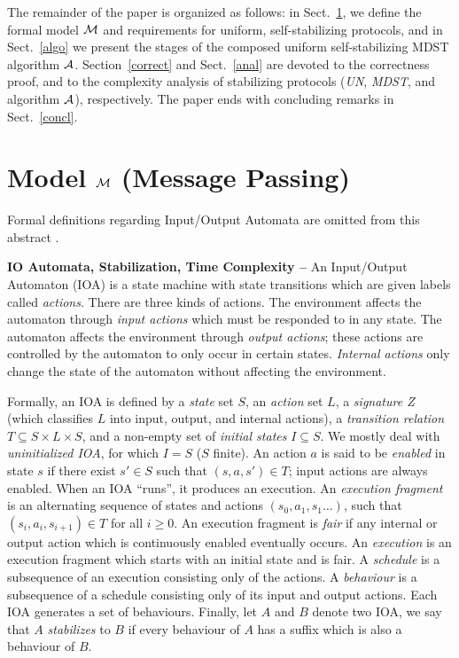 \documentclass[10pt]{article}
\begin{document}
The remainder of the paper is organized as follows: in
Sect.~\ref{model}, we define the formal model $\cal M$ and
requirements for uniform, self-stabilizing protocols, and in
Sect.~\ref{algo} we present the stages of the composed uniform
self-stabilizing MDST algorithm $\cal A$. Section~\ref{correct} and
Sect.~\ref{anal} are devoted to the correctness proof, and to the
complexity analysis of stabilizing protocols ({\em UN}, {\em MDST},
and algorithm $\cal A$), respectively. The paper ends with concluding
remarks in Sect.~\ref{concl}.

\section{Model $\cal M$ (Message Passing)}\label{model}
Formal definitions regarding Input/Output Automata are omitted from this
abstract \cite{APVD94,Varg94}.

{\bf IO Automata, Stabilization, Time Complexity --}
An Input/Output Automaton (IOA) is a state machine with state transitions
which are given labels called {\em actions}. There are three kinds of actions.
The environment affects the automaton through {\em input actions} which
must be responded to in any state. The automaton affects the environment
through {\em output actions}; these actions are controlled by the automaton
to only occur in certain states. {\em Internal actions} only change the
state of the automaton without affecting the environment.

Formally, an IOA is defined by a {\em state} set $S$, an {\em action} set
$L$, a {\em signature Z} (which classifies $L$ into input, output, and
internal actions), a {\em transition relation} $T \subseteq S \times L \times
S$, and a non-empty set of {\em initial states} $I \subseteq S$. We mostly
deal with {\em uninitialized IOA}, for which $I=S$ ($S$ finite). An action
$a$ is said to be {\em enabled} in state $s$ if there exist $s' \in S$ such
that $(s,a,s') \in T$; input actions are always enabled.
When an IOA ``runs'', it produces an execution. An {\em execution fragment}
is an alternating sequence of states and actions $(s_0,a_1,s_1 \ldots)$,
such that $(s_i,a_i,s_{i+1}) \in T$ for all $i \geq 0$. An execution fragment
is {\em fair} if any internal or output action which is continuously
enabled eventually occurs. An {\em execution} is an execution fragment
which starts with an initial state and is fair. A {\em schedule} is a
subsequence of an execution consisting only of the actions. A {\em
behaviour} is a subsequence of a schedule consisting only of its input
and output actions. Each IOA generates a set of behaviours. Finally, let
$A$ and $B$ denote two IOA, we say that $A$ {\em stabilizes} to $B$ if
every behaviour of $A$ has a suffix which is also a behaviour of $B$.
\end{document}
